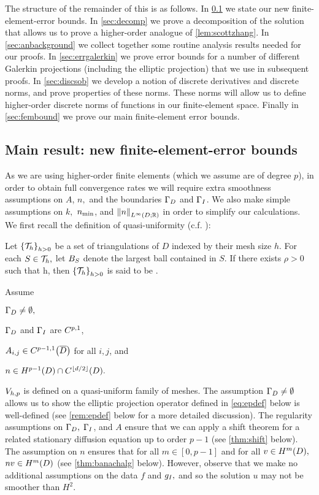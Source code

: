 The structure of the remainder of this  is as follows. In \cref{sec:errbounds} we state our new finite-element-error bounds. In \cref{sec:decomp} we prove a decomposition of the solution that allows us to prove a higher-order analogue of \cref{lem:scottzhang}. In \cref{sec:anbackground} we collect together some routine analysis results needed for our proofs. In \cref{sec:errgalerkin} we prove error bounds for a number of different Galerkin projections (including the elliptic projection) that we use in subsequent proofs. In \cref{sec:discsob} we develop a notion of discrete derivatives and discrete norms, and prove properties of these norms. These norms will allow us to define higher-order discrete norms of functions in our finite-element space. Finally in \cref{sec:fembound} we prove our main finite-element error bounds.



\subsection{Main result: new finite-element-error bounds}\label{sec:errbounds}
As we are using higher-order finite elements (which we assume are of degree $p$), in order to obtain full convergence rates we will require extra smoothness assumptions on $A$, $n,$ and the boundaries $\Gamma_{D}$ and $\Gamma_{I}$. We also make simple assumptions on $k,$ $n_{\min}$, and $\NLiDRR{n}$ in order to simplify our calculations. We first recall the definition of quasi-uniformity (c.f. \cite[Definition 4.4.13]{BrSc:08}):

\label{def:quasiuniform}
Let $\set{\cTh}_{h>0}$ be a set of triangulations of $D$ indexed by their mesh size $h.$ For each $S \in \mathcal T_{h},$ let $B_{S}$ denote the largest ball contained in $S$.
If there exists $\rho > 0$ such that 
\beqs
\min{} \geq \rho h,
\eeqs
then $\set{\cTh}_{h>0}$ is said to be .
\ede

\label{ass:highp}
Assume
\bit
\item $\Gamma_{D} \neq \emptyset,$
\item $\Gamma_{D}$ and $\Gamma_{I}$ are $C^{p,1}$,
\item $\Aij \in \CpmooDclos$ for all $i,j$, and
\item $n \in \HpmoD \cap \CfloordtD.$
  \item $V_{h,p}$ is defined on a quasi-uniform family of meshes.
  \eit
  \eas
  The assumption $\Gamma_{D} \neq \emptyset$ allows us to show the elliptic projection operator defined in \cref{eq:epdef} below is well-defined (see \cref{rem:epdef} below for a more detailed discussion). The regularity assumptions on $\Gamma_{D},$ $\Gamma_{I}$, and $A$ ensure that we can apply a shift theorem for a related stationary diffusion equation up to order $p-1$ (see \cref{thm:shift} below). The assumption on $n$ ensures that for all $m \in [0,p-1]$ and for all $v \in \HmD,$ $nv \in \HmD$ (see \cref{thm:banachalg} below). However, observe that we make no additional assumptions on the data $f$ and $g_{I},$ and so the solution $u$ may not be smoother than $H^2.$

